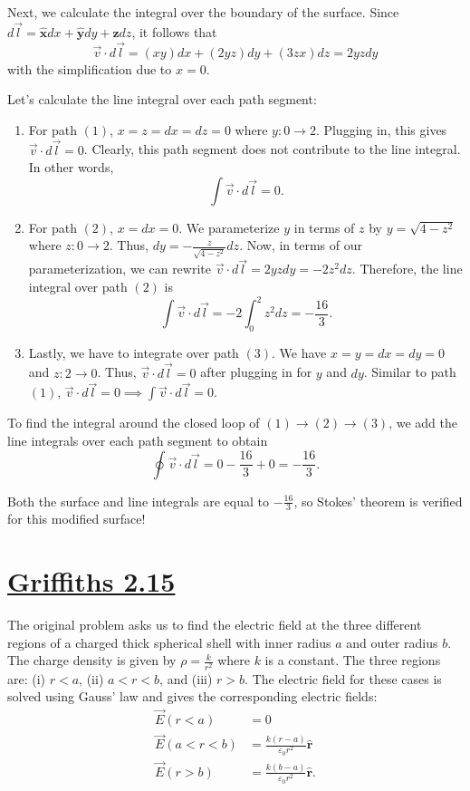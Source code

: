 \documentclass{article}
\newcommand{\xhat}{\hat{\textbf{x}}}
\newcommand{\yhat}{\hat{\textbf{y}}}
\newcommand{\zhat}{\hat{\textbf{z}}}
\newcommand{\rhat}{\hat{\textbf{r}}}
\begin{document}
Next, we calculate the integral over the boundary of the surface. Since $d\vec{l} = \xhat dx + \yhat dy + \zhat dz$, it follows that
\begin{equation}
	\vec{v}\cdot d\vec{l} = (xy)dx + (2yz)dy + (3zx)dz = 2yz dy
\end{equation}
with the simplification due to $x=0$.

Let's calculate the line integral over each path segment:
\begin{enumerate}
	\item For path $(1)$, $x=z=dx=dz=0$ where $y:0\to2$. Plugging in, this gives $\vec{v}\cdot d\vec{l} = 0$. Clearly, this path segment does not contribute to the line integral. In other words, 
	\begin{equation}
		\int\vec{v}\cdot d\vec{l} = 0.
	\end{equation}
	
	\item For path $(2)$, $x=dx=0$. We parameterize $y$ in terms of $z$ by $y = \sqrt{4-z^2}$ where $z:0\to2$. Thus, $dy = -\frac{z}{\sqrt{4-z^2}}dz$. Now, in terms of our parameterization, we can rewrite $\vec{v}\cdot d\vec{l} = 2yzdy = -2z^2dz$. Therefore, the line integral over path $(2)$ is
	\begin{equation}
		\int\vec{v}\cdot d\vec{l} = -2\int_0^2z^2dz = -\frac{16}{3}.
	\end{equation}

	\item Lastly, we have to integrate over path $(3)$. We have $x=y=dx=dy=0$ and $z:2\to0$. Thus, $\vec{v}\cdot d\vec{l} = 0$ after plugging in for $y$ and $dy$. Similar to path $(1)$, $\vec{v}\cdot d\vec{l} = 0 \implies \int\vec{v}\cdot d\vec{l} = 0$.
\end{enumerate}
To find the integral around the closed loop of $(1)\to(2)\to(3)$, we add the line integrals over each path segment to obtain
\begin{equation}
	\oint\vec{v}\cdot d\vec{l} = 0 - \frac{16}{3} + 0 = -\frac{16}{3}.
\end{equation}

Both the surface and line integrals are equal to $-\frac{16}{3}$, so Stokes' theorem is verified for this modified surface!
\clearpage

\section*{\underline{Griffiths 2.15}}
The original problem asks us to find the electric field at the three different regions of a charged thick spherical shell with inner radius $a$ and outer radius $b$. The charge density is given by $\rho = \frac{k}{r^2}$ where $k$ is a constant. The three regions are: (i) $r < a$, (ii) $a < r < b$, and (iii) $r > b$. The electric field for these cases is solved using Gauss' law and gives the corresponding electric fields:
\begin{align*}
	\vec{E}(r<a) &= 0 \\
	\vec{E}(a<r<b) &= \frac{k(r-a)}{\varepsilon_0r^2}\rhat \\
	\vec{E}(r>b) &= \frac{k(b-a)}{\varepsilon_0r^2}\rhat.
\end{align*}
\end{document}
